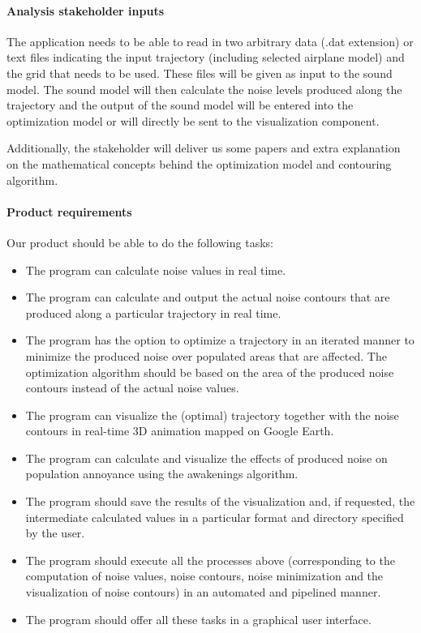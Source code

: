 \paragraph{Analysis stakeholder inputs} 
The application needs to be able to read in two arbitrary data (.dat extension) or text files indicating the input trajectory (including selected airplane model) and the grid that needs to be used. These files will be given as input to the sound model. The sound model will then calculate the noise levels produced along the trajectory and the output of the sound model will be entered into the optimization model or will directly be sent to the visualization component.

Additionally, the stakeholder will deliver us some papers and extra explanation on the mathematical concepts behind the optimization model and contouring algorithm. 

\paragraph{Product requirements} 
Our product should be able to do the following tasks:

\begin{itemize}
\item The program can calculate noise values in real time.
\item The program can calculate and output the actual noise contours that are produced along a particular trajectory in real time.
\item The program has the option to optimize a trajectory in an iterated manner to minimize the produced noise over populated areas that are affected. The optimization algorithm should be based on the area of the produced noise contours instead of the actual noise values.
\item The program can visualize the (optimal) trajectory together with the noise contours in real-time 3D animation mapped on Google Earth.
\item The program can calculate and visualize the effects of produced noise on population annoyance using the awakenings algorithm.
\item The program should save the results of the visualization and, if requested, the intermediate calculated values in a particular format and directory specified by the user.
\item The program should execute all the processes above (corresponding to the computation of noise values, noise contours, noise minimization and the visualization of noise contours) in an automated and pipelined manner.
\item The program should offer all these tasks in a graphical user interface.
\end{itemize}

